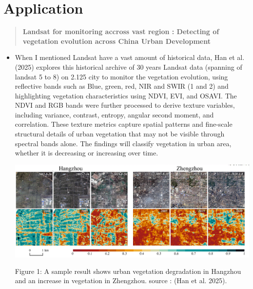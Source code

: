 \documentclass[
  letterpaper,
  DIV=11,
  numbers=noendperiod]{scrreprt}
\begin{document}
\hypertarget{application}{%
\section{\texorpdfstring{\textbf{Application}}{Application}}\label{application}}

\begin{quote}
\textbf{Landsat for monitoring accross vast region : Detecting of
vegetation evolution across China Urban Development}
\end{quote}

\begin{itemize}
\item
  When I mentioned Landsat have a vast amount of historical data, Han et
  al. (2025) explores this historical archive of 30 years Landsat data
  (spanning of landsat 5 to 8) on 2.125 city to monitor the vegetation
  evolution, using reflective bands such as Blue, green, red, NIR and
  SWIR (1 and 2) and highlighting vegetation characteristics using NDVI,
  EVI, and OSAVI. The NDVI and RGB bands were further processed to
  derive texture variables, including variance, contrast, entropy,
  angular second moment, and correlation. These texture metrics capture
  spatial patterns and fine-scale structural details of urban vegetation
  that may not be visible through spectral bands alone. The findings
  will classify vegetation in urban area, whether it is decreasing or
  increasing over time.

  \includegraphics[width=6.96875in,height=\textheight]{images/clipboard-1072383063.png}

  Figure 1: A sample result shows urban vegetation degradation in
  Hangzhou and an increase in vegetation in Zhengzhou. source : (Han et
  al. 2025).
\end{itemize}
\end{document}
